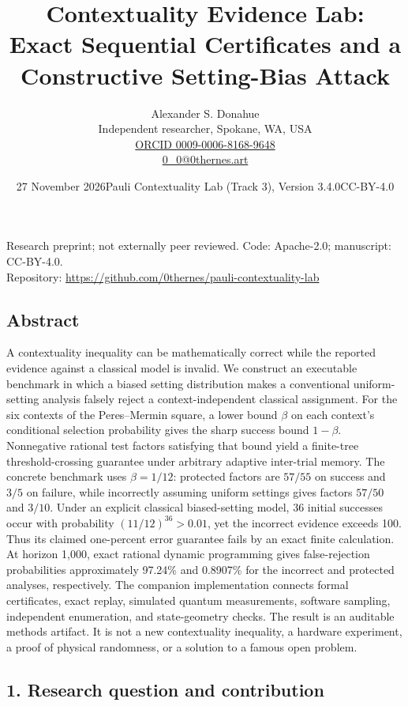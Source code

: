 \documentclass[10pt,a4paper]{article}
\title{\vspace{-10mm}\sffamily\bfseries Contextuality Evidence Lab:\\Exact Sequential Certificates and a Constructive Setting-Bias Attack}
\author{Alexander S. Donahue\\\small Independent researcher, Spokane, WA, USA\\\small\href{https://orcid.org/0009-0006-8168-9648}{ORCID 0009-0006-8168-9648}\\\small\href{mailto:0_0@0thernes.art}{0\_0@0thernes.art}}
\date{27 November 2026\quad\textbullet\quad Pauli Contextuality Lab (Track 3), Version 3.4.0\quad\textbullet\quad CC-BY-4.0}
\begin{document}
\maketitle
\begin{center}\small Research preprint; not externally peer reviewed. Code: Apache-2.0; manuscript: CC-BY-4.0.\\Repository: \href{https://github.com/0thernes/pauli-contextuality-lab}{https://github.com/0thernes/pauli-contextuality-lab}\end{center}
\subsection{Abstract}\label{abstract}

A contextuality inequality can be mathematically correct while the
reported evidence against a classical model is invalid. We construct an
executable benchmark in which a biased setting distribution makes a
conventional uniform-setting analysis falsely reject a
context-independent classical assignment. For the six contexts of the
Peres--Mermin square, a lower bound \(\beta\) on each context's
conditional selection probability gives the sharp success bound
\(1-\beta\). Nonnegative rational test factors satisfying that bound
yield a finite-tree threshold-crossing guarantee under arbitrary
adaptive inter-trial memory. The concrete benchmark uses \(\beta=1/12\):
protected factors are \(57/55\) on success and \(3/5\) on failure, while
incorrectly assuming uniform settings gives factors \(57/50\) and
\(3/10\). Under an explicit classical biased-setting model, 36 initial
successes occur with probability \((11/12)^{36}>0.01\), yet the
incorrect evidence exceeds 100. Thus its claimed one-percent error
guarantee fails by an exact finite calculation. At horizon 1,000, exact
rational dynamic programming gives false-rejection probabilities
approximately 97.24\% and 0.8907\% for the incorrect and protected
analyses, respectively. The companion implementation connects formal
certificates, exact replay, simulated quantum measurements, software
sampling, independent enumeration, and state-geometry checks. The result
is an auditable methods artifact. It is not a new contextuality
inequality, a hardware experiment, a proof of physical randomness, or a
solution to a famous open problem.

\subsection{1. Research question and
contribution}\label{research-question-and-contribution}
\end{document}
